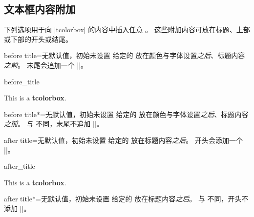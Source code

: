 \clearpage
\subsection{文本框内容附加}\label{subsec:contentadditions}
下列选项用于向 |tcolorbox| 的内容中插入任意 。
这些附加内容可放在标题、上部或下部的开头或结尾。

\begin{docTcbKey}[][doc updated=2023-01-27]{before title}{=}{无默认值，初始未设置}
  给定的  放在颜色与字体设置\emph{之后}、标题内容\emph{之前}。
   末尾会追加一个 |\ignorespaces|。
\begin{exdispExample}{before_title}

\begin{tcolorbox}[title=My title]
This is a \textbf{tcolorbox}.
\end{tcolorbox}
\end{exdispExample}
\end{docTcbKey}


\begin{docTcbKey}[][doc new=2023-01-27]{before title*}{=}{无默认值，初始未设置}
  给定的  放在颜色与字体设置\emph{之后}、标题内容\emph{之前}。
  与  不同，末尾不追加 |\ignorespaces|。
\end{docTcbKey}


\begin{docTcbKey}[][doc updated=2023-01-27]{after title}{=}{无默认值，初始未设置}
  给定的  放在标题内容\emph{之后}。
   开头会添加一个 |\unskip|。
\begin{exdispExample}{after_title}

\begin{tcolorbox}[title=My title]
This is a \textbf{tcolorbox}.
\end{tcolorbox}
\end{exdispExample}
\end{docTcbKey}


\begin{docTcbKey}[][doc new=2023-01-27]{after title*}{=}{无默认值，初始未设置}
  给定的  放在标题内容\emph{之后}。
  与  不同，开头不添加 |\unskip|。
\end{docTcbKey}



